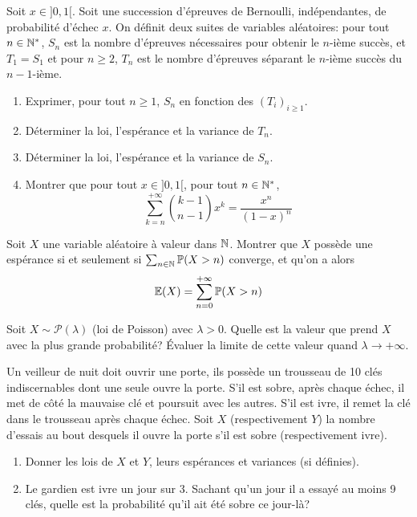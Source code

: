 \documentclass[12pt]{article}
\begin{document}
\begin{exercise}
	Soit $x\in]0,1[$. Soit une succession d'épreuves de Bernoulli, indépendantes,
	de probabilité d'échec $x$. On définit deux suites de variables aléatoires:
	pour tout $n\in\mathbb{N}^{*}$, $S_{n}$ est la nombre d'épreuves nécessaires pour
	obtenir le $n$-ième succès, et $T_{1}=S_{1}$ et pour $n\geqslant2$, $T_{n}$
	est le nombre d'épreuves séparant le $n$-ième succès du $n-1$-ième.
	\begin{enumerate}
		\item
		Exprimer, pour tout $n\geqslant1$, $S_{n}$ en fonction des
		$(T_{i})_{i\geqslant1}$.
		\item
		Déterminer la loi, l'espérance et la variance de $T_{n}$.
		\item
		Déterminer la loi, l'espérance et la variance de $S_{n}$.
		\item
		Montrer que pour tout $x\in]0,1[$, pour tout $n\in\mathbb{N}^{*}$,
		$$\sum_{k=n}^{+\infty}\binom{k-1}{n-1}x^{k}=\frac{x^{n}}{(1-x)^{n}}$$
	\end{enumerate}
\end{exercise}

\begin{exercise}
Soit $X$ une variable aléatoire à valeur dans $\mathbb{N}$. Montrer que $X$ possède une
espérance si et seulement si $\sum_{n\in\mathbb{N}}\mathbb{P}(X>n)$ converge, et qu'on a alors
$$\mathbb{E}(X)=\sum_{n=0}^{+\infty}\mathbb{P}(X>n)$$
\end{exercise}

\begin{exercise}
	Soit $X\sim\mathcal{P}(\lambda)$ (loi de Poisson) avec $\lambda>0$. Quelle est
	la valeur que prend $X$ avec la plus grande probabilité? Évaluer la limite de
	cette valeur quand $\lambda\to+\infty$.
\end{exercise}

\begin{exercise}
	Un veilleur de nuit doit ouvrir une porte, ils possède un trousseau de 10 clés
	indiscernables dont une seule ouvre la porte. S'il est sobre, après chaque
	échec, il met de côté la mauvaise clé et poursuit avec les autres. S'il est
	ivre, il remet la clé dans le trousseau après chaque échec. Soit $X$
	(respectivement $Y$) la nombre d'essais au bout desquels il ouvre la porte
	s'il est sobre (respectivement ivre).
	\begin{enumerate}
		\item
		Donner les lois de $X$ et $Y$, leurs espérances et variances (si
		définies).
		\item
		Le gardien est ivre un jour sur 3. Sachant qu'un jour il a essayé au moins
		9 clés, quelle est la probabilité qu'il ait été sobre ce jour-là?
	\end{enumerate}
\end{exercise}
\end{document}
